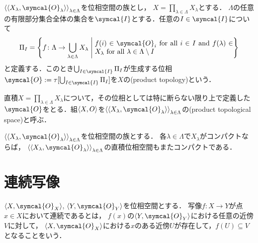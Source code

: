 \documentclass[../main.tex]{subfiles}
\begin{document}
\begin{thmbox}
\begin{definition}
\({\tuple{\tuple{X_\lambda, \symcal{O}_\lambda}}}_{\lambda \in \Lambda}\)を位相空間の族とし，
\(X = \prod_{\lambda \in \Lambda} X_\lambda\)とする．
\(\Lambda\)の任意の有限部分集合全体の集合を\(\symcal{I}\)とする．任意の\(I \in \symcal{I}\)について
\begin{align*}
    \Pi_I = \left\{ f\colon \Lambda \to \bigcup_{\lambda \in \Lambda} X_\lambda \relmiddle{|} \text{\parbox{7cm}{\(f(i) \in \symcal{O}_i\) for all \(i \in I\) and \(f(\lambda) \in X_\lambda\) for all \(\lambda \in \Lambda \setminus I\)}}\right\}
\end{align*}
と定義する．このとき\(\bigcup_{I \in \symcal{I}} \Pi_I\)が生成する位相\(\symcal{O}:=\tau[\bigcup_{I \in \symcal{I}}\Pi_I]\)を\(X\)の(product topology)という．
\end{definition}
\end{thmbox}

直積\(X = \prod_{\lambda \in \Lambda} X_\lambda\)について，その位相としては特に断らない限り上で定義した\(\symcal{O}\)をとる．組\(\langle X, O \rangle\)を\({\tuple{\tuple{X_\lambda, \symcal{O}_\lambda}}}_{\lambda \in \Lambda}\)の(product topological space)と呼ぶ．


\begin{thmbox}
\begin{theorem}[（Tikhonovの定理）]
\({\tuple{\tuple{X_\lambda, \symcal{O}_\lambda}}}_{\lambda \in \Lambda}\)を位相空間の族とする．
各\(\lambda \in \Lambda\)で\(X_\lambda\)がコンパクトならば，
\({\tuple{\tuple{X_\lambda, \symcal{O}_\lambda}}}_{\lambda \in \Lambda}\)の直積位相空間もまたコンパクトである．
\end{theorem}
\end{thmbox}

\section{連続写像}
\begin{thmbox}
\begin{definition}
\(\tuple{X, \symcal{O}_{X}}\), \(\tuple{Y, \symcal{O}_{Y}}\)を位相空間とする．
写像\(f\colon X \to Y\)が点\(x \in X\)において連続であるとは，
\(f(x)\)の\(\tuple{Y, \symcal{O}_{Y}}\)における任意の近傍\(V\)に対して，
\(\tuple{X, \symcal{O}_{X}}\)における\(x\)のある近傍\(U\)が存在して，\(f(U) \subseteq V\)となることをいう．
\end{definition}
\end{thmbox}
\end{document}
